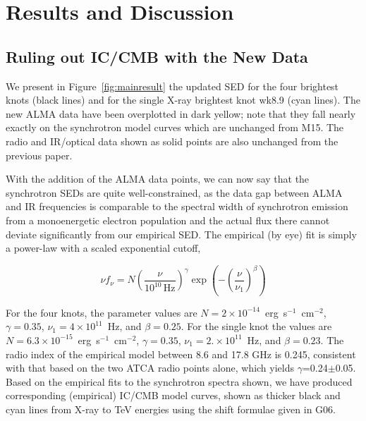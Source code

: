 \documentclass[twocolumn]{aastex61}
\begin{document}
\clearpage
\section{Results and Discussion}

\subsection{Ruling out IC/CMB with the New Data}

We present in Figure~\ref{fig:mainresult} the updated SED for the four
brightest knots (black lines) and for the single X-ray brightest knot
wk8.9 (cyan lines). The new ALMA data have been overplotted in dark
yellow; note that they fall nearly exactly on the synchrotron model
curves which are unchanged from M15. The radio and IR/optical data
shown as solid points are also unchanged from the previous paper.


With the addition of the ALMA data points, we can now say that the
synchrotron SEDs are quite well-constrained, as the data gap between
ALMA and IR frequencies is comparable to the spectral width of
synchrotron emission from a monoenergetic electron population and the
actual flux there cannot deviate significantly from our empirical SED.
 The empirical (by eye) fit is simply a power-law with a scaled exponential cutoff,

\begin{equation}
  \nu f_\nu=N\left(\frac{\nu}{10^{10}\mathrm{\,Hz}}\right)^\gamma \exp{\left(-\left(\frac{\nu}{\nu_1}\right)^\beta\right)}
\end{equation}

 For the four knots, the parameter values are $N=2\times
 10^{-14}$~erg~s$^{-1}$~cm$^{-2}$, $\gamma=0.35$, $\nu_1=4\times
 10^{11}$~Hz, and $\beta=0.25$.  For the single knot the values are
 $N=6.3\times 10^{-15}$~erg~s$^{-1}$~cm$^{-2}$, $\gamma=0.35$,
 $\nu_1=2.\times 10^{11}$~Hz, and $\beta=0.23$. The radio index of the
 empirical model between 8.6 and 17.8 GHz is 0.245, consistent with
 that based on the two ATCA radio points alone, which yields
 $\gamma$=0.24$\pm$0.05. Based on the empirical fits to the
 synchrotron spectra shown, we have produced corresponding (empirical)
 IC/CMB model curves, shown as thicker black and cyan lines from X-ray
 to TeV energies using the shift formulae given in G06.
\end{document}
